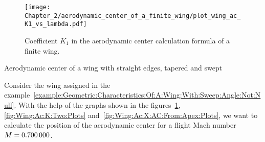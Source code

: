 \documentclass[[12pt,twoside]{book}
\begin{document}
\begin{figure}[t]%
  \centering
    \texttt{[image: Chapter\_2/aerodynamic\_center\_of\_a\_finite\_wing/plot\_wing\_ac\_K1\_vs\_lambda.pdf]}%
  \caption{
           Coefficient $K_1$ in the aerodynamic center calculation formula of a finite wing.}
  \label{fig:Wing:Ac:K:One:Plots}%
\end{figure}

\begin{myExampleX}{Aerodynamic center of a wing with straight edges, tapered and swept}{\ \myIconGraph\ }%
\label{example:Wing:Aerodynamic:Center:Of:A:Finite:Wing}
%

%
\noindent
Consider the wing assigned in the example~\ref{example:Geometric:Characteristics:Of:A:Wing:With:Sweep:Angle:Not:Null}.
With the help of the graphs shown in the figures~\ref{fig:Wing:Ac:K:One:Plots},
\ref{fig:Wing:Ac:K:Two:Plots} and~\ref{fig:Wing:Ac:X:AC:From:Apex:Plots}, we want to calculate
the position of the aerodynamic center for a flight Mach number
$\Mach = \SI[round-precision=2]{\myMach}{}$.


\end{myExampleX}
\end{document}
